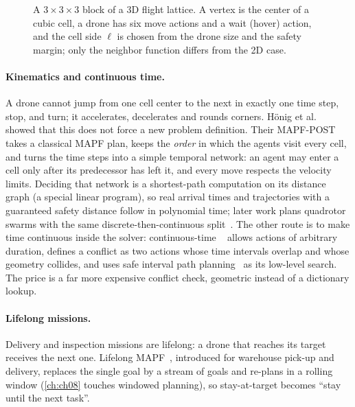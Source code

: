 \begin{figure}[!htb]
  \centering
  \caption{A $3 \times 3 \times 3$ block of a 3D flight lattice. A vertex is
  the center of a cubic cell, a drone has six move actions and a wait (hover)
  action, and the cell side $\ell$ is chosen from the drone size and the
  safety margin; only the neighbor function differs from the 2D case.}
  \label{fig:ch07-lattice}
\end{figure}

\paragraph{Kinematics and continuous time.}
A drone cannot jump from one cell center to the next in exactly one time
step, stop, and turn; it accelerates, decelerates and rounds corners.
H\"onig et al.~\cite{honig2016mapf}
showed that this does not force a new problem definition. Their MAPF-POST
takes a classical MAPF plan, keeps the \emph{order} in which the agents visit
every cell, and turns the time steps into a simple temporal network: an agent
may enter a cell only after its predecessor has left it, and every move
respects the velocity limits. Deciding that network is a shortest-path
computation on its distance graph (a special linear program), so
real arrival times and trajectories with a guaranteed safety distance follow
in polynomial time; later work plans quadrotor swarms with the same
discrete-then-continuous split~\cite{honig2018trajectory}. The other route is
to make time continuous
inside the solver: continuous-time \cbs~\cite{andreychuk2019ccbs}
allows actions of arbitrary duration, defines a conflict as two actions
whose time intervals overlap and whose geometry collides, and uses safe
interval path planning~\cite{phillips2011sipp} as its low-level search.
The price is a far more expensive conflict check, geometric instead of a
dictionary lookup.

\paragraph{Lifelong missions.}
Delivery and inspection missions are lifelong: a drone that reaches its
target receives the next one. Lifelong MAPF~\cite{ma2017lifelong},
introduced for warehouse pick-up and delivery, replaces the single goal by a
stream of goals and re-plans in a rolling window (\cref{ch:ch08} touches
windowed planning), so stay-at-target becomes ``stay until the next task''.


